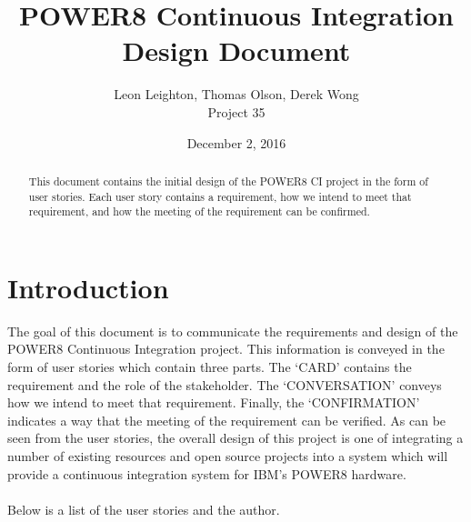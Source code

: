 \documentclass[10pt,letterpaper,onecolumn,journal]{IEEEtran}
\begin{document}
\begin{titlepage}
  \title{POWER8 Continuous Integration\\ Design Document}
  \author{Leon Leighton, Thomas Olson, Derek Wong\\Project 35}
  \date{December 2, 2016}
  \maketitle
  \vspace{4cm}
  \begin{abstract}
  \noindent This document contains the initial design of the POWER8 CI project in the form of user stories.
    Each user story contains a requirement, how we intend to meet that requirement, and how the meeting of the requirement can be confirmed.
  \end{abstract}
\end{titlepage}

\tableofcontents
\clearpage

\section{Introduction}
The goal of this document is to communicate the requirements and design of the POWER8 Continuous Integration project.
This information is conveyed in the form of user stories which contain three parts.
The `CARD' contains the requirement and the role of the stakeholder.
The `CONVERSATION' conveys how we intend to meet that requirement.
Finally, the `CONFIRMATION' indicates a way that the meeting of the requirement can be verified.
As can be seen from the user stories, the overall design of this project is one of integrating a number of existing resources and open source projects into a system which will provide a continuous integration system for IBM's POWER8 hardware.\\\\
Below is a list of the user stories and the author.\\
\end{document}
